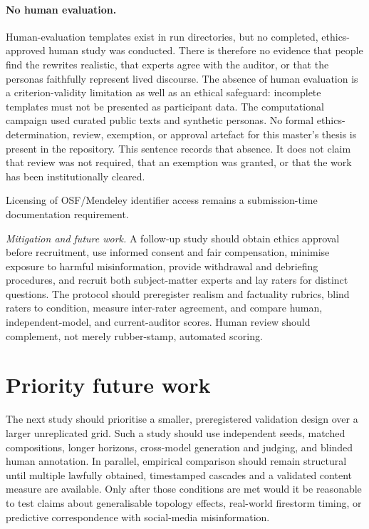 \paragraph{No human evaluation.}
Human-evaluation templates exist in run directories, but no completed,
ethics-approved human study was conducted. There is therefore no evidence
that people find the rewrites realistic, that experts agree with the auditor,
or that the personas faithfully represent lived discourse. The absence of
human evaluation is a criterion-validity limitation as well as an ethical
safeguard: incomplete templates must not be presented as participant data.
The computational campaign used curated public texts and synthetic personas.
No formal ethics-determination, review, exemption, or approval artefact for
this master's thesis is present in the repository.
This sentence records that absence.
It does not claim that review was not required, that an exemption was
granted, or that the work has been institutionally cleared.
\begin{sloppypar}
\end{sloppypar}
Licensing of OSF/Mendeley identifier access remains a submission-time
documentation requirement.

\emph{Mitigation and future work.}  A follow-up study should obtain ethics
approval before recruitment, use informed consent and fair compensation,
minimise exposure to harmful misinformation, provide withdrawal and debriefing
procedures, and recruit both subject-matter experts and lay raters for distinct
questions.  The protocol should preregister realism and factuality rubrics,
blind raters to condition, measure inter-rater agreement, and compare human,
independent-model, and current-auditor scores.  Human review should complement,
not merely rubber-stamp, automated scoring.

\section{Priority future work}

The next study should prioritise a smaller, preregistered validation design
over a larger unreplicated grid. Such a study should use independent seeds, matched
compositions, longer horizons, cross-model generation and judging, and blinded
human annotation.  In parallel, empirical comparison should remain structural
until multiple lawfully obtained, timestamped cascades and a validated content
measure are available.  Only after those conditions are met would it be
reasonable to test claims about generalisable topology effects, real-world
firestorm timing, or predictive correspondence with social-media
misinformation.
